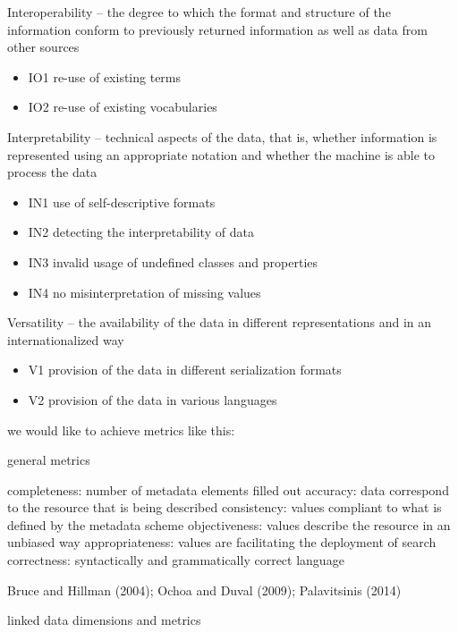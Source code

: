 Interoperability -- the degree to which the format and structure of the information conform to previously returned information as well as data from other sources
\begin{itemize}
 \setlength{\parskip}{0pt}
 \setlength{\itemsep}{0pt plus 1pt}
 \item IO1 re-use of existing terms
 \item IO2 re-use of existing vocabularies
\end{itemize}

Interpretability -- technical aspects of the data, that is, whether information is represented using an appropriate notation and whether the machine is able to process the data
\begin{itemize}
 \setlength{\parskip}{0pt}
 \setlength{\itemsep}{0pt plus 1pt}
 \item IN1 use of self-descriptive formats
 \item IN2 detecting the interpretability of data
 \item IN3 invalid usage of undefined classes and properties
 \item IN4 no misinterpretation of missing values
\end{itemize}

Versatility -- the availability of the data in different representations and in an internationalized way
\vspace{0mm}
\begin{itemize}
 \setlength{\parskip}{0pt}
 \setlength{\itemsep}{0pt plus 1pt}
 \item V1 provision of the data in different serialization formats
 \item V2 provision of the data in various languages
\end{itemize}


we would like to achieve metrics like this:

general metrics

completeness: number of metadata elements filled out
accuracy: data correspond to the resource that is being described
consistency: values compliant to what is defined by the metadata scheme
objectiveness: values describe the resource in an unbiased way
appropriateness: values are facilitating the deployment of search
correctness: syntactically and grammatically correct language

Bruce and Hillman (2004); Ochoa and Duval (2009); Palavitsinis (2014)

linked data dimensions and metrics

